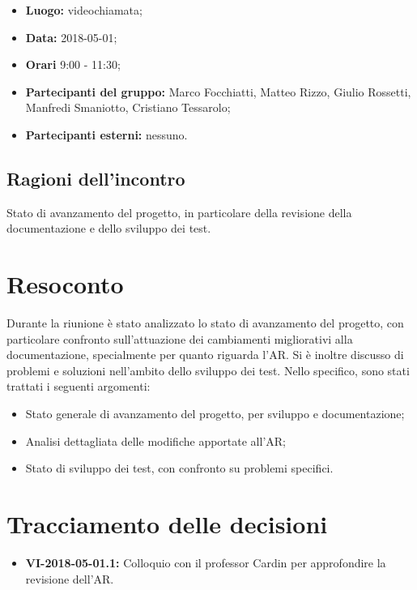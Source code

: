 \documentclass[openany,12pt,a4paper]{article}
\begin{document}
	\begin{itemize} 
	    \item \textbf{Luogo:} videochiamata;
	    \item \textbf{Data:} 2018-05-01;
	    \item \textbf{Orari} 9:00 - 11:30;
	    \item \textbf{Partecipanti del gruppo:} Marco Focchiatti, Matteo Rizzo, Giulio Rossetti, Manfredi Smaniotto, Cristiano Tessarolo;
	    \item \textbf{Partecipanti esterni:} nessuno.
	\end{itemize}
	
	\subsection{Ragioni dell'incontro}
	
	Stato di avanzamento del progetto, in particolare della revisione della documentazione e dello sviluppo dei test.

	\section{Resoconto}
	
	Durante la riunione è stato analizzato lo stato di avanzamento del progetto, con particolare confronto sull'attuazione dei cambiamenti migliorativi alla documentazione, specialmente per quanto riguarda l'AR. Si è inoltre discusso di problemi e soluzioni nell'ambito dello sviluppo dei test. Nello specifico, sono stati trattati i seguenti argomenti:
	
	\begin{itemize}
		\item Stato generale di avanzamento del progetto, per sviluppo e documentazione;
		\item Analisi dettagliata delle modifiche apportate all'AR;
		\item Stato di sviluppo dei test, con confronto su problemi specifici.
	\end{itemize}  
	
	\section{Tracciamento delle decisioni}
	
	\begin{itemize}
	    \item \textbf{VI-2018-05-01.1:} Colloquio con il professor Cardin per approfondire la revisione dell'AR.
	\end{itemize}	

	
\end{document}
